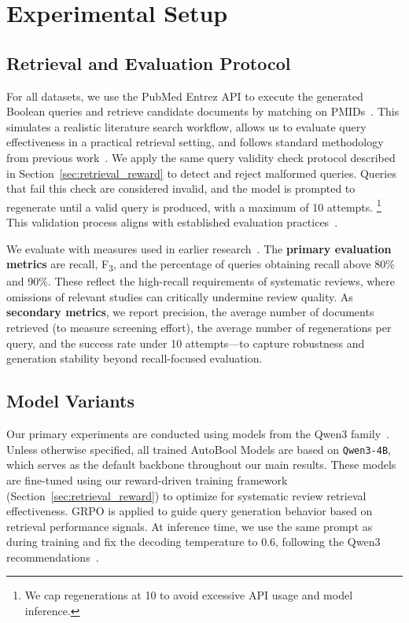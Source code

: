 \section{Experimental Setup}

\subsection{Retrieval and Evaluation Protocol}
For all datasets, we use the PubMed Entrez API to execute the generated Boolean queries and retrieve candidate documents by matching on PMIDs~\cite{sayers2010general}. This simulates a realistic literature search workflow, allows us to evaluate query effectiveness in a practical retrieval setting, and follows standard methodology from previous work~\cite{wang2023can, wang2025reassessing}.
We apply the same query validity check protocol described in Section~\ref{sec:retrieval_reward} to detect and reject malformed queries. Queries that fail this check are considered invalid, and the model is prompted to regenerate until a valid query is produced, with a maximum of 10 attempts.%
\footnote{We cap regenerations at 10 to avoid excessive API usage and model inference.}
This validation process aligns with established evaluation practices~\cite{wang2025reassessing}.

We evaluate with measures used in earlier research~\cite{wang2025reassessing}. The \textbf{primary evaluation metrics} are recall, F\textsubscript{3}, and the percentage of queries obtaining recall above 80\% and 90\%. These reflect the high-recall requirements of systematic reviews, where omissions of relevant studies can critically undermine review quality.
As \textbf{secondary metrics}, we report precision, the average number of documents retrieved (to measure screening effort), the average number of regenerations per query, and the success rate under 10 attempts---to capture robustness and generation stability beyond recall-focused evaluation.

\subsection{Model Variants}
Our primary experiments are conducted using models from the Qwen3 family~\cite{yang2025qwen3}. Unless otherwise specified, all trained AutoBool Models are based on \texttt{Qwen3-4B}, which serves as the default backbone throughout our main results. These models are fine-tuned using our reward-driven training framework (Section~\ref{sec:retrieval_reward}) to optimize for systematic review retrieval effectiveness. GRPO is applied to guide query generation behavior based on retrieval performance signals. 
At inference time, we use the same prompt as during training and fix the decoding temperature to 0.6, following the Qwen3 recommendations~\cite{yang2025qwen3}.


